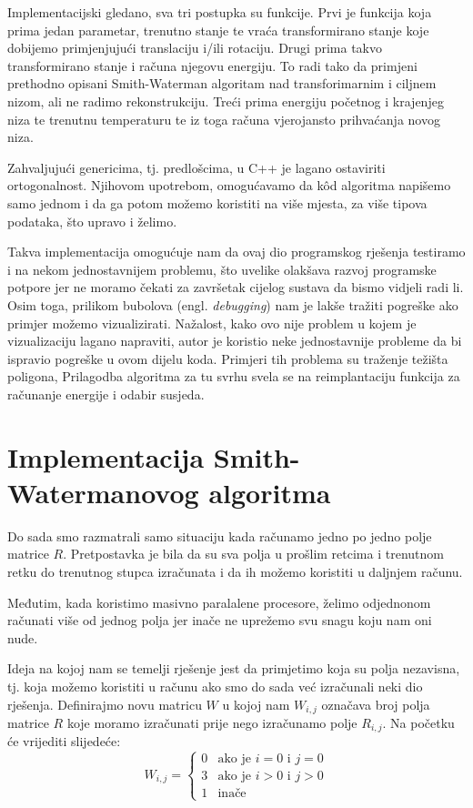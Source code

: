 \documentclass[times, utf8, zavrsni]{fer}
\begin{document}
Implementacijski gledano, sva tri postupka su funkcije.
Prvi je funkcija koja prima jedan parametar, trenutno stanje
te vraća transformirano stanje koje dobijemo primjenjujući
translaciju i/ili rotaciju.
Drugi prima takvo transformirano stanje i računa njegovu
energiju. To radi tako da primjeni prethodno opisani
Smith-Waterman algoritam nad transforimarnim i ciljnem
nizom, ali ne radimo rekonstrukciju. 
Treći prima energiju početnog i krajenjeg niza te trenutnu
temperaturu te iz toga računa vjerojansto prihvaćanja
novog niza. 

Zahvaljujući genericima, tj. predlošcima, u C++ je lagano
ostaviriti ortogonalnost. Njihovom upotrebom, omogućavamo
da kôd algoritma napišemo samo jednom i da ga potom možemo
koristiti na više mjesta, za više tipova podataka,
što upravo i želimo. 

Takva implementacija omogućuje nam da ovaj dio programskog
rješenja testiramo i na nekom jednostavnijem problemu, što
uvelike olakšava razvoj programske potpore jer ne moramo
čekati za završetak cijelog sustava da bismo vidjeli radi li.
Osim toga, prilikom bubolova (engl. \textit{debugging}) nam
je lakše tražiti pogreške ako primjer možemo vizualizirati.
Nažalost, kako ovo nije problem u kojem je vizualizaciju
lagano napraviti, autor je koristio neke jednostavnije
probleme da bi ispravio pogreške u ovom dijelu koda. Primjeri
tih problema su traženje težišta poligona, %
Prilagodba algoritma za tu svrhu svela se na reimplantaciju
funkcija za računanje energije i odabir susjeda. 


\section{Implementacija Smith-Watermanovog algoritma}
Do sada smo razmatrali samo situaciju kada računamo jedno
po jedno polje matrice $R$. Pretpostavka je bila da su 
sva polja u prošlim retcima i trenutnom retku do trenutnog
stupca izračunata i da ih možemo koristiti u daljnjem
računu. 

Međutim, kada koristimo masivno paralalene procesore, 
želimo odjednonom računati više od jednog polja jer inače
ne uprežemo svu snagu koju nam oni nude.

Ideja na kojoj nam se temelji rješenje jest da primjetimo koja
su polja nezavisna, tj. koja možemo koristiti u računu ako
smo do sada već izračunali neki dio rješenja. Definirajmo
novu matricu $W$ u kojoj nam $W_{i,j}$ označava broj polja 
matrice $R$ koje moramo izračunati prije nego izračunamo
polje $R_{i,j}$. Na početku će vrijediti slijedeće:
$$
W_{i,j} = \left\{ \begin{array}{ll}
	0 & \mbox{ako je } i=0 \mbox{ i } j=0 \\
	3 & \mbox{ako je } i>0 \mbox{ i } j>0 \\
	1 & \mbox{inače}
\end{array} \right.
$$
\end{document}
